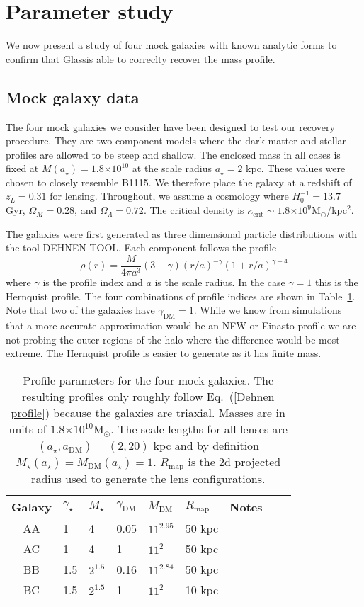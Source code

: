 \documentclass[galley]{mn2e}
\newcommand{\Glass}{{\sc Glass}}
\newcommand{\Rmap}{\ensuremath{R_\mathrm{map}}}
\newcommand{\Msun}{\ensuremath{\mathrm{M}_\odot}}
\newcommand{\tabref}[1] {Table~\ref{#1}}
\newcommand{\eqnref}[1] {Eq.~(\ref{#1})}
\newcommand{\e}[1]{\ensuremath{\times 10^{#1}}}
\begin{document}
\section{Parameter study}

We now present a study of four mock galaxies with known analytic forms to
confirm that \Glass is able to correclty recover the mass profile.

\subsection{Mock galaxy data}

The four mock galaxies we consider have been designed to test our recovery
procedure. They are two component models where the dark matter and stellar
profiles are allowed to be steep and shallow.  The enclosed mass in all cases
is fixed at $M(a_\star)= 1.8\e{10}$ at the scale radius $a_\star=2$ kpc. These
values were chosen to closely resemble B1115. We therefore place the galaxy at
a redshift of $z_L = 0.31$ for lensing.  Throughout, we assume a cosmology
where $H_0^{-1}=13.7$ Gyr, $\Omega_M=0.28$, and $\Omega_\Lambda=0.72$. The
critical density is $\kappa_\mathrm{crit}\sim 1.8\e{9}$\Msun/kpc$^2$.

The galaxies were
first generated as three dimensional particle distributions with the
tool DEHNEN-TOOL. Each component follows the profile
\begin{equation}
\rho(r) = \frac{M}{4\pi a^3}(3-\gamma){(r/a)^{-\gamma}(1 + r/a)^{\gamma-4}}
\label{Dehnen profile}
\end{equation}
where $\gamma$ is the profile index and $a$ is the scale radius.  In the
case $\gamma=1$ this is the Hernquist profile.  The four combinations of
profile indices are shown in \tabref{mock galaxy params}.  Note that two of
the galaxies have $\gamma_\mathrm{DM}=1$. While we know from simulations that a
more accurate approximation would be an NFW or Einasto profile we are not
probing the outer regions of the halo where the difference would be most
extreme.  The Hernquist profile is easier to generate as it has finite mass.

\begin{table}
\begin{tabular}{cllllllll}
Galaxy & $\gamma_\star$ & $M_\star$ & $\gamma_\mathrm{DM}$ & $M_\mathrm{DM}$ & $\Rmap$ & Notes\\
\hline
AA & 1 & 4 & 0.05 & $11^{2.95}$ & 50 kpc & \\
AC & 1 & 4 & 1 & $11^2$ & 50 kpc & \\
BB & 1.5 & $2^{1.5}$ & 0.16 & $11^{2.84}$ & 50 kpc & \\
BC & 1.5 & $2^{1.5}$ & 1 & $11^2$ & 10 kpc & 
\end{tabular}
\caption{Profile parameters for the four mock galaxies. The resulting profiles only roughly follow
\eqnref{Dehnen profile} because the galaxies are triaxial. Masses are in units of $1.8\e{10}\Msun$. The scale lengths for
all lenses are $(a_\star,a_\mathrm{DM})=(2,20)$ kpc and by definition
$M_\star(a_\star) = M_\mathrm{DM}(a_\star) = 1$. $\Rmap$ is the 2d projected radius used to generate the lens configurations.}
\label{mock galaxy params}
\end{table}
\end{document}
